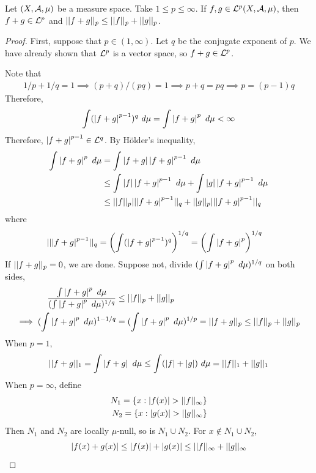 \documentclass[11pt]{article}
\newcommand{\dmu}[0]{\ d\mu}
\begin{document}
	\begin{theorem}
		Let $(X, \mathcal{{A}}, \mu)$ be a measure space. Take $1 \leq p \leq \infty$. If $f, g \in \mathcal{{L}}^p(X, \mathcal{{A}}, \mu)$, then $f + g \in \mathcal{{L}}^p$ and $\vert \vert {f+g} \vert \vert_p \leq \vert \vert {f} \vert \vert_p + \vert \vert {g} \vert \vert_p$.
		\begin{proof}
			First, suppose that $p \in (1, \infty)$. Let $q$ be the conjugate exponent of $p$. We have already shown that $\mathcal{{L}}^p$ is a vector space, so $f + g \in \mathcal{{L}}^p$.
			
			Note that
			\begin{align}
				1/p + 1/q = 1 \implies (p+q)/(pq) = 1 \implies p + q = pq \implies p = (p-1)q
			\end{align}
			Therefore,
			\begin{align}
				\int (\abs{f+g}^{p-1})^q\dmu = \int \abs{f+g}^p\dmu < \infty
			\end{align}
			Therefore, $\left \vert {f+g} \right \vert^{p-1} \in \mathcal{{L}}^q$. By H\"older's inequality,
			\begin{align}
				\int \abs{f+g}^p\dmu &= \int \abs{f+g} \abs{f+g}^{p-1}\dmu \\
				&\leq \int \abs{f}\abs{f+g}^{p-1}\dmu + \int \abs{g}\abs{f+g}^{p-1}\dmu \\
				&\leq \norm{f}_p \norm{\abs{f+g}^{p-1}}_q  + \norm{g}_p \norm{\abs{f+g}^{p-1}}_q
			\end{align}
			where
			\begin{align}
				\vert \vert {\left \vert {f+g} \right \vert^{p-1}} \vert \vert_q &= \left(\int (\left \vert {f+g} \right \vert^{p-1})^q \right)^{1/q} = \left(\int \left \vert {f+g} \right \vert^p \right)^{1/q}
			\end{align}
			If $\vert \vert {f+g} \vert \vert_p = 0$, we are done. Suppose not, divide $(\int \abs{f+g}^p\dmu)^{1/q}$ on both sides,
			\begin{align}
				\frac{\int \abs{f+g}^p\dmu}{(\int \abs{f+g}^p\dmu)^{1/q}} &\leq \norm{f}_p + \norm{g}_p \\
				\implies (\int \abs{f+g}^p\dmu)^{1-1/q} &= (\int \abs{f+g}^p\dmu)^{1/p} = \norm{f+g}_p \leq \norm{f}_p + \norm{g}_p 
			\end{align}
			When $p = 1$,
			\begin{align}
				\norm{f+g}_1 = \int \abs{f+g}\dmu \leq \int (\abs{f}+\abs{g})\dmu = \norm{f}_1 + \norm{g}_1
			\end{align}
			When $p = \infty$, define
			\begin{align}
				N_1 = \{x: \left \vert {f(x)} \right \vert > \vert \vert {f} \vert \vert_\infty\} \\
				N_2 = \{x: \left \vert {g(x)} \right \vert > \vert \vert {g} \vert \vert_\infty\}
			\end{align}
			Then $N_1$ and $N_2$ are locally $\mu$-null, so is $N_1 \cup N_2$. For $x \notin N_1 \cup N_2$,
			\begin{align}
				\left \vert {f(x) + g(x)} \right \vert \leq \left \vert {f(x)} \right \vert + \left \vert {g(x)} \right \vert \leq \vert \vert {f} \vert \vert_\infty + \vert \vert {g} \vert \vert_\infty
			\end{align}
		\end{proof}
	\end{theorem}
\end{document}
